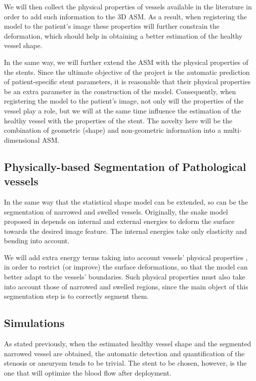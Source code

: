 \approach
We will then collect the physical properties of vessels available in the literature \citep{ZAHN-11d,BOUS-09c,BOUS-08c,SULA-08a,Oubel,zhang:1294,Balocco} in order to add such information to the 3D ASM. As a result, when registering the model to the patient's image these properties will further constrain the deformation, which should help in obtaining a better estimation of the healthy vessel shape. 

In the same way, we will further extend the ASM with the physical properties of the stents. Since the ultimate objective of the project is the automatic prediction of patient-specific stent parameters, it is reasonable that their physical properties be an extra parameter in the construction of the model. Consequently, when registering the model to the patient's image, not only will the properties of the vessel play a role, but we will at the same time influence the estimation of the healthy vessel with the properties of the stent. The novelty here will be the combination of geometric (shape) and non-geometric information into a multi-dimensional ASM. 

\subsection{Physically-based Segmentation of Pathological vessels}

\challenge
In the same way that the statistical shape model can be extended, so can be the segmentation of narrowed and swelled vessels. Originally, the snake model proposed in \citep{Kass} depends on internal and external energies to deform the surface towards the desired image feature. The internal energies take only elasticity and bending into account. 

\approach
We will add extra energy terms taking into account vessels' physical properties \citep{BOUS-09c,ZAHN-11d}, in order to restrict (or improve) the surface deformations, so that the model can better adapt to the vessels' boundaries. Such physical properties must also take into account those of narrowed and swelled regions, since the main object of this segmentation step is to correctly segment them.

\subsection{Simulations}

\challenge
As stated previously, when the estimated healthy vessel shape and the segmented narrowed vessel are obtained, the automatic detection and quantification of the stenosis or aneurysm tends to be trivial. The stent to be chosen, however, is the one that will optimize the blood flow after deployment. 

